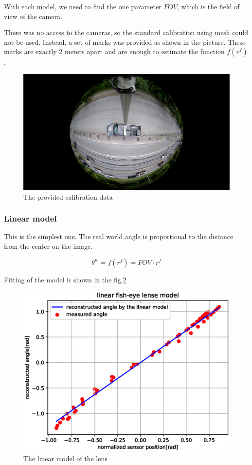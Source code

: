 \documentclass[a4paper,12pt,titlepage]{article}
\numberwithin{figure}{section}
\begin{document}
With each model, we need to find the one parameter $FOV$, which is the field of view of the camera.

There was no access to the cameras, so the standard calibration using mesh could not be used. Instead, a set of marks was provided as shown in the picture. These marks are exactly 2 meters apart and are enough to estimate the function $f(r^f)$.

\begin{figure}[h!]
\centering
\includegraphics[width=1\linewidth]{fig/calibration.png}
\caption{The provided calibration data}
\label{fig:calibration}
\end{figure}


\subsubsection{Linear model}

This is the simplest one. The real world angle is proportional to the distance from the center on the image. 

\begin{equation}
\theta^w = f(r^f) = FOV \cdot r^f
\end{equation}

Fitting of the model is shown in the fig.\ref{fig:linear_model}

\begin{figure}[h!]
\centering
\includegraphics[width=1\linewidth]{fig/linear_model3.eps}
\caption{The linear model of the lens}
\label{fig:linear_model}
\end{figure}
\end{document}
